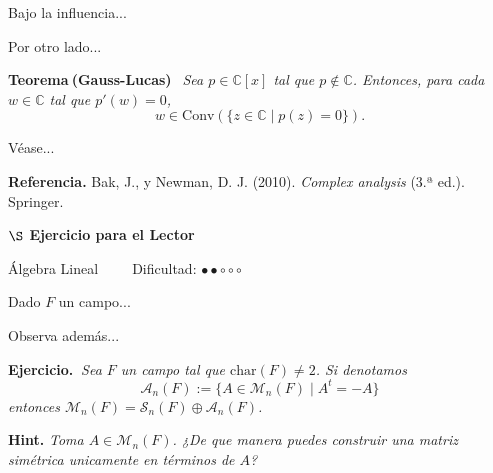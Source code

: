 \documentclass[8pt]{extarticle}
\begin{document}
{\fontsize{7}{5} \selectfont
Bajo la influencia... 
}
\newpage

{\fontsize{7}{5} \selectfont
Por otro lado... 
}
\vspace{0.2cm}

\noindent
{\small {}\selectfont \textbf{Teorema$~$(Gauss-Lucas)} $~~$\textit{Sea $p\in \mathbb{C}[x]$ tal que $p\notin \mathbb{C}$. Entonces, para cada $w\in \mathbb{C}$ tal que $p'(w)=0$,
$$w\in \mathrm{Conv}(\{z\in \mathbb{C}\mid p(z)=0\}).$$
}} 
\vspace{0.2cm}
{\fontsize{7}{5} \selectfont Véase... 

{\footnotesize {}\selectfont \textbf{Referencia.}
Bak, J., y Newman, D. J. (2010). \textit{Complex analysis} (3.ª ed.). Springer.} 


}
\newpage


\begin{center}
    {\large \textbf{ $\S$ Ejercicio para el Lector}} {$~$\small\faGlasses}
\end{center}

\begin{center}
    Álgebra Lineal $~~~~~~~~$ Dificultad: $\bullet \bullet \circ \circ\circ $
\end{center}

{\fontsize{7}{5} \selectfont Dado $F$ un campo...
}
\newpage

{\fontsize{7}{5} \selectfont Observa además...
}
\vspace{0.2cm}

\noindent
{\small {}\selectfont \textbf{Ejercicio.} $~$\textit{Sea $F$ un campo tal que $\mathrm{char}(F)\neq 2$. Si denotamos
$$\mathcal{A}_{n}(F):=\{A\in \mathcal{M}_{n}(F)\mid A^{t}=-A\}$$
entonces $\mathcal{M}_{n}(F)=\mathcal{S}_{n}(F)\oplus \mathcal{A}_{n}(F)$.}
\vspace{0.1cm}

\noindent
\textbf{Hint.} \textit{Toma $A\in \mathcal{M}_{n}(F)$. ¿De que manera puedes construir una matriz simétrica unicamente en términos de $A$?} 
}



\newpage



\begin{figure}[h]
    \raggedleft
    \vspace{1.3cm} %
    \label{fig:placeholder}
    \vspace{-1.3cm} %
\end{figure}
\end{document}
